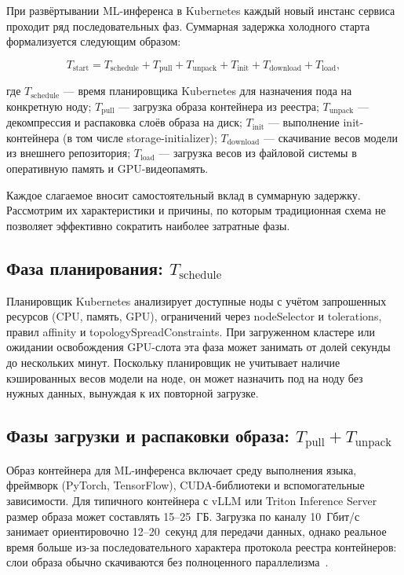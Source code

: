 При развёртывании ML-инференса в Kubernetes каждый новый инстанс сервиса проходит ряд последовательных фаз. Суммарная задержка холодного старта формализуется следующим образом:

\begin{equation}
T_{\mathrm{start}} = T_{\mathrm{schedule}} + T_{\mathrm{pull}} + T_{\mathrm{unpack}} + T_{\mathrm{init}} + T_{\mathrm{download}} + T_{\mathrm{load}},
\label{eq:cold_start}
\end{equation}

где $T_{\mathrm{schedule}}$ --- время планировщика Kubernetes для назначения пода на конкретную ноду; $T_{\mathrm{pull}}$ --- загрузка образа контейнера из реестра; $T_{\mathrm{unpack}}$ --- декомпрессия и распаковка слоёв образа на диск; $T_{\mathrm{init}}$ --- выполнение init-контейнера (в том числе storage-initializer); $T_{\mathrm{download}}$ --- скачивание весов модели из внешнего репозитория; $T_{\mathrm{load}}$ --- загрузка весов из файловой системы в оперативную память и GPU-видеопамять.

Каждое слагаемое вносит самостоятельный вклад в суммарную задержку. Рассмотрим их характеристики и причины, по которым традиционная схема не позволяет эффективно сократить наиболее затратные фазы.

\subsection{Фаза планирования: $T_{\mathrm{schedule}}$}

Планировщик Kubernetes анализирует доступные ноды с учётом запрошенных ресурсов (CPU, память, GPU), ограничений через nodeSelector и tolerations, правил affinity и topologySpreadConstraints. При загруженном кластере или ожидании освобождения GPU-слота эта фаза может занимать от долей секунды до нескольких минут. Поскольку планировщик не учитывает наличие кэшированных весов модели на ноде, он может назначить под на ноду без нужных данных, вынуждая к их повторной загрузке.

\subsection{Фазы загрузки и распаковки образа: $T_{\mathrm{pull}} + T_{\mathrm{unpack}}$}

Образ контейнера для ML-инференса включает среду выполнения языка, фреймворк (PyTorch, TensorFlow), CUDA-библиотеки и вспомогательные зависимости. Для типичного контейнера с vLLM или Triton Inference Server размер образа может составлять 15--25~ГБ. Загрузка по каналу 10~Гбит/с занимает ориентировочно 12--20~секунд для передачи данных, однако реальное время больше из-за последовательного характера протокола реестра контейнеров: слои образа обычно скачиваются без полноценного параллелизма~\cite{bentoml2024cold}.

